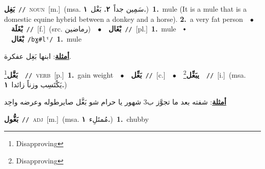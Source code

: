 \documentclass[10pt,a4paper,twoside]{article} %
\begin{document}
\begin{multicols}{2}
{\setlength\topsep{0pt}\textbf{\foreignlanguage{arabic}{بَغِل}}\ {\color{gray}\texttt{//}\color{black}}\ \textsc{noun}\ [m.]\ \color{gray}(msa. \foreignlanguage{arabic}{سَمِين جداً}~\foreignlanguage{arabic}{\textbf{٢.}}  \foreignlanguage{arabic}{بَغْل}~\foreignlanguage{arabic}{\textbf{١.}})\color{black}\ \textbf{1.}~mule (It is a mule that is a domestic equine hybrid between a donkey and a horse).  \textbf{2.}~a very fat person\ \ $\bullet$\ \ \setlength\topsep{0pt}\textbf{\foreignlanguage{arabic}{بْغَلَة}}\ {\color{gray}\texttt{//}\color{black}}\ [f.]\ (src. \color{gray}\foreignlanguage{arabic}{رماضين}\color{black})\ \ $\bullet$\ \ \setlength\topsep{0pt}\textbf{\foreignlanguage{arabic}{بْغَال}}\ {\color{gray}\texttt{//}\color{black}}\ [pl.]\ \textbf{1.}~mule\ \ $\smblkdiamond$\ \ \setlength\topsep{0pt}\textbf{\foreignlanguage{arabic}{بْغَال}}\ {\color{gray}\texttt{/bɣ\#lˤ/}\color{black}}\ \textbf{1.}~mule\  \begin{flushright}\color{gray}\foreignlanguage{arabic}{\textbf{\underline{\foreignlanguage{arabic}{أمثلة}}}: ابنها بَغِل عفكرة.}\end{flushright}\color{black}} \vspace{2mm}

{\setlength\topsep{0pt}\textbf{\foreignlanguage{arabic}{بَغَّل}}\footnote{Disapproving}\ \ {\color{gray}\texttt{//}\color{black}}\ \textsc{verb}\ [p.]\ \textbf{1.}~gain weight\ \ $\bullet$\ \ \setlength\topsep{0pt}\textbf{\foreignlanguage{arabic}{بَغِّل}}\ {\color{gray}\texttt{//}\color{black}}\ [c.]\ \ $\bullet$\ \ \setlength\topsep{0pt}\textbf{\foreignlanguage{arabic}{يبَغِّل}}\footnote{Disapproving}\ \ {\color{gray}\texttt{//}\color{black}}\ [i.]\ \color{gray}(msa. \foreignlanguage{arabic}{يَكْتَسِب وزناً زائدا}~\foreignlanguage{arabic}{\textbf{١.}})\color{black}\  \begin{flushright}\color{gray}\foreignlanguage{arabic}{\textbf{\underline{\foreignlanguage{arabic}{أمثلة}}}: شفته بعد ما تجوَّز ب3 شهور يا حرام شو بَغَّل صايرطوله وعرضه واحِد}\end{flushright}\color{black}} \vspace{2mm}

{\setlength\topsep{0pt}\textbf{\foreignlanguage{arabic}{بَغُّول}}\ {\color{gray}\texttt{//}\color{black}}\ \textsc{adj}\ [m.]\ \color{gray}(msa. \foreignlanguage{arabic}{مُمتَلِء}~\foreignlanguage{arabic}{\textbf{١.}})\color{black}\ \textbf{1.}~chubby\ } \vspace{2mm}


\end{multicols}
\end{document}
